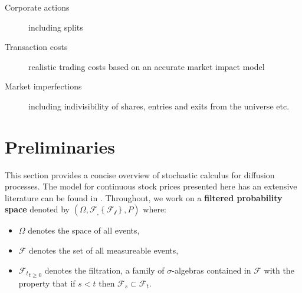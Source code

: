 \documentclass[british]{amsart}
\numberwithin{equation}{section}
\numberwithin{figure}{section}
\theoremstyle{plain}
\theoremstyle{definition}
\theoremstyle{plain}
\theoremstyle{plain}
\theoremstyle{plain}
\theoremstyle{remark}
\theoremstyle{plain}
\newcommand{\filtration}[1]{\mathcal{F_{#1}}}
\begin{document}
% 
% 
% 

\begin{description}
	\item [Corporate actions] including splits
	\item [Transaction costs] realistic trading costs based on an accurate 
		market impact model
	\item [Market imperfections] including indivisibility of shares, entries 
		and exits from the universe etc.
\end{description}

\section{Preliminaries}

This section provides a concise overview of stochastic calculus for
diffusion processes. The model for continuous stock prices presented
here has an extensive literature can be found in \cite{shreve2012}.
Throughout, we work on a \textbf{filtered probability space} denoted
by $(\Omega,\filtration,\left\{ \filtration{t}\right\} ,P)$
where:

\begin{itemize}
	\item $\Omega$ denotes the space of all events,
	\item $\mathcal{F}$ denotes the set of all measureable events,
	\item ${\mathcal{F}_{t}}_{t\ge0}$ denotes the filtration, a family of 
				$\sigma$-algebras contained in $\mathcal{F}$ with
				the property that if $s<t$ then $\mathcal{F}_{s}\subset\mathcal{F}_{t}$. 
\end{itemize}
\end{document}
